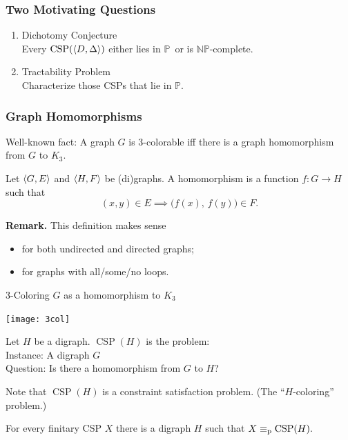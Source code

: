 \documentclass[12pt,xcolor=dvipsnames,handout
   ]{beamer}
\DeclareMathOperator{\CSP}{CSP}
\renewcommand{\.}{\cdot}
\newcommand{\equivp}{\equiv_{\text{\textnormal{p}}}}
\newcommand{\NP}{\ensuremath{\mathbb{NP}}\xspace}
\renewcommand{\P}{\ensuremath{\mathbb{P}}\xspace}
\let\origtextbf=\textbf
\let\emph=\alert
\renewcommand{\textbf}[1]{{\usebeamercolor[fg]{example text}%
     \origtextbf{#1}}}
\begin{document}
\begin{frame}
  \frametitle{Two Motivating Questions}

  \begin{enumerate}
  \item \emph{Dichotomy Conjecture}\\ Every $\CSP(\<D,\Delta\>)$ either
    lies in \P\ or is $\NP$-complete.

    \pause

  \item \emph{Tractability Problem}\\ Characterize those CSPs that lie in \P.
  \end{enumerate}
\end{frame}

\begin{frame}
  \frametitle{Graph Homomorphisms}

  Well-known fact: A graph $G$ is 3-colorable iff there is a
  graph homomorphism from $G$ to $K_3$. 

  \pause

  \begin{definition}
    Let $\langle G,E\rangle$ and $\langle H,F\rangle$ be (di)graphs. A \emph{homomorphism} is
    a function $f\colon G \to H$ such that $$(x,y)\in E \implies
    \bigl(f(x),\, f(y)\bigr) \in F.$$
  \end{definition}

  \pause

  \textbf{Remark.} This definition makes sense
  \begin{itemize}
  \item  for both undirected and directed graphs;
  \item for graphs with all/some/no loops.
  \end{itemize}

\end{frame}

\begin{frame}
  \begin{center}
    3-Coloring $G$ as a homomorphism to $K_3$

    \texttt{[image: 3col]}
  \end{center}
\end{frame}

\begin{frame}
  \begin{definition}
    Let $H$ be a digraph. $\CSP(H)$ is the problem:\\
    \emph{Instance:} A digraph $G$\\
    \emph{Question:} Is there a homomorphism from $G$ to $H$?
  \end{definition}

  Note that $\CSP(H)$ is a constraint satisfaction problem. (The
  ``$H$-coloring'' problem.)

  \pause
  \begin{theorem}
    For every finitary CSP $X$ there is a digraph $H$ such that
    $X\equivp \CSP(H).$
  \end{theorem}

\end{frame}
\end{document}

